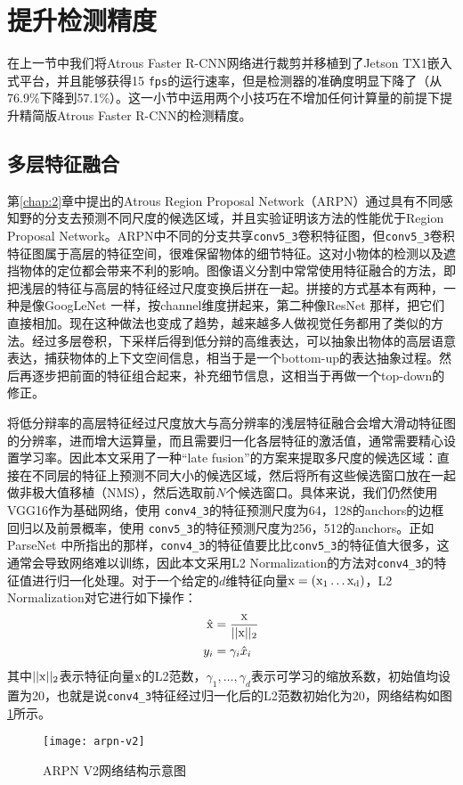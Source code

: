 \section{提升检测精度}
在上一节中我们将Atrous Faster R-CNN网络进行裁剪并移植到了Jetson TX1嵌入式平台，并且能够获得15 \texttt{fps}的运行速率，但是检测器的准确度明显下降了（从76.9\%下降到57.1\%）。这一小节中运用两个小技巧在不增加任何计算量的前提下提升精简版Atrous Faster R-CNN的检测精度。

\subsection{多层特征融合}
第\ref{chap:2}章中提出的Atrous Region Proposal Network（ARPN）通过具有不同感知野的分支去预测不同尺度的候选区域，并且实验证明该方法的性能优于Region Proposal Network。ARPN中不同的分支共享\texttt{conv5\_3}卷积特征图，但\texttt{conv5\_3}卷积特征图属于高层的特征空间，很难保留物体的细节特征。这对小物体的检测以及遮挡物体的定位都会带来不利的影响。图像语义分割中常常使用特征融合的方法，即把浅层的特征与高层的特征经过尺度变换后拼在一起。拼接的方式基本有两种，一种是像GoogLeNet \cite{inception-v4}一样，按channel维度拼起来，第二种像ResNet \cite{resnet}那样，把它们直接相加。现在这种做法也变成了趋势，越来越多人做视觉任务都用了类似的方法。经过多层卷积，下采样后得到低分辩的高维表达，可以抽象出物体的高层语意表达，捕获物体的上下文空间信息，相当于是一个bottom-up的表达抽象过程。然后再逐步把前面的特征组合起来，补充细节信息，这相当于再做一个top-down的修正。

将低分辩率的高层特征经过尺度放大与高分辨率的浅层特征融合会增大滑动特征图的分辨率，进而增大运算量，而且需要归一化各层特征的激活值，通常需要精心设置学习率。因此本文采用了一种``late fusion''的方案来提取多尺度的候选区域：直接在不同层的特征上预测不同大小的候选区域，然后将所有这些候选窗口放在一起做非极大值移植（NMS），然后选取前$N$个候选窗口。具体来说，我们仍然使用VGG16作为基础网络，使用 \texttt{conv4\_3}的特征预测尺度为64，128的anchors的边框回归以及前景概率，使用 \texttt{conv5\_3}的特征预测尺度为256，512的anchors。正如ParseNet \cite{parsenet}中所指出的那样，\texttt{conv4\_3}的特征值要比比\texttt{conv5\_3}的特征值大很多，这通常会导致网络难以训练，因此本文采用L2 Normalization的方法对\texttt{conv4\_3}的特征值进行归一化处理。对于一个给定的$d$维特征向量$\rm{x}=(x_1\dots x_d)$，L2 Normalization对它进行如下操作：
\begin{equation}
\begin{aligned}
\hat{\rm{x}} &= \frac{\rm{x}}{||\rm{x}||_2} \\
y_i &= \gamma_i \hat{x}_i
\end{aligned}
\end{equation}
其中$||\rm{x}||_2$表示特征向量$\rm{x}$的L2范数，$\gamma_1,\dots, \gamma_d$表示可学习的缩放系数，初始值均设置为20，也就是说\texttt{conv4\_3}特征经过归一化后的L2范数初始化为20，网络结构如图\ref{fig:arpn-v2}所示。
\begin{figure}[h]
	\centering
	\texttt{[image: arpn-v2]}
	\caption{ARPN V2网络结构示意图}
	\label{fig:arpn-v2}
\end{figure}

